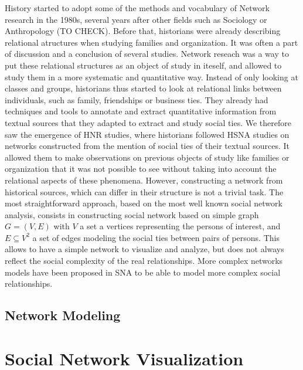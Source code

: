 History started to adopt some of the methods and vocabulary of Network research in the 1980s, several years after other fields such as Sociology or Anthropology (TO CHECK). Before that, historians were already describing relational atructures when studying families and organization. It was often a part of discussion and a conclusion of several studies.
Network reseach was a way to put these relational structures as an object of study in iteself, and allowed to study them in a more systematic and quantitative way.
Instead of only looking at classes and groups, historians thus started to look at relational links between individuals, such as family, friendships or business ties.
They already had techniques and tools to annotate and extract quantitative information from textual sources that they adapted to extract and study social ties.
We therefore saw the emergence of HNR studies, where historians followed HSNA studies on networks constructed from the mention of social ties of their textual sources.
It allowed them to make observations on previous objects of study like families or organization that it was not possible to see without taking into account the relational aspects of these phenomena.
However, constructing a network from historical sources, which can differ in their structure is not a trivial task. The most straightforward approach, based on the most well known social network analysis, consists in constructing social network based on simple graph $G = (V, E)$ with $V$ a set a vertices representing the persons of interest, and $E \subseteq V^2$ a set of edges modeling the social ties between pairs of persons.
This allows to have a simple network to visualize and analyze, but does not always reflect the social complexity of the real relationships.
More complex networks models have been proposed in SNA to be able to model more complex social relationships.

\subsection{Network Modeling}





\section{Social Network Visualization}









